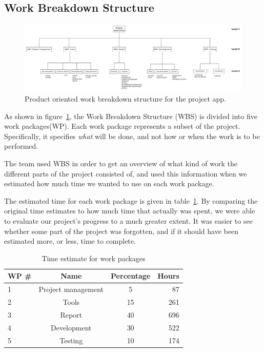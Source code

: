 
\subsection{Work Breakdown Structure}
\label{sec:wbs}

\begin{figure}[H]
\includegraphics[width=\textwidth]{ch/projectManagement/fig/wbs.png}
\caption{Product oriented work breakdown structure for the project app.}
\label{fig:wbs}
\end{figure}

As shown in figure~\ref{fig:wbs}, the Work Breakdown Structure (WBS) is divided into five work packages(WP). Each work package represents a subset of the project. Specifically, it specifies \emph{what} will be done, and not how or when the work is to be performed.

The team used WBS in order to get an overview of what kind of work the different parts of the project consisted of, and used this information when we estimated how much time we wanted to use on each work package.

The estimated time for each work package is given in table~\ref{tab:timeEstWP}. By comparing the original time estimates to how much time that actually was spent, we were able to evaluate our project's progress to a much greater extent. It was easier to see whether some part of the project was forgotten, and if it should have been estimated more, or less, time to complete.

\begin{table}[H]
\centering
{}
\begin{tabular}{|l|c|c|r|}
\hline
    \textbf{WP \#} & \textbf{Name} & \textbf{Percentage} & \textbf{Hours} \\\hline
    1 & Project management & 5 & 87\\\hline
    2 & Tools 			   & 15 & 261\\\hline
    3 & Report 			   & 40 & 696\\\hline
    4 & Development 	   & 30 & 522\\\hline
    5 & Testing  		   & 10 & 174\\\hline
\end{tabular}
\caption{Time estimate for work packages}
\label{tab:timeEstWP}
\end{table}